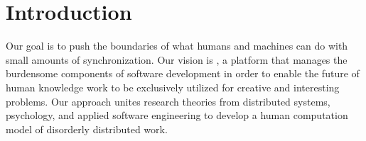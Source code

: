 
\section*{Introduction} %
\label{sec:introduction}

%

Our goal is to push the boundaries of what humans and machines can do with small amounts of synchronization.
Our vision is \pname, a platform that manages the burdensome components of software development in order to enable the future of human knowledge work to be exclusively utilized for creative and interesting problems.
Our approach unites research theories from distributed systems, psychology, and applied software engineering to develop a human computation model of disorderly distributed work.
